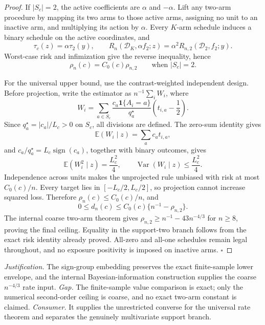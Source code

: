 \documentclass{article}
\begin{document}
\begin{proof}
If \(|S_c|=2\), the active coefficients are \(\alpha\) and \(-\alpha\). Lift any two-arm procedure by mapping its two arms to those active arms, assigning no unit to an inactive arm, and multiplying its action by \(\alpha\). Every \(K\)-arm schedule induces a binary schedule on the active coordinates, and
\[
 \tau_c(z)=\alpha\tau_2(y),
 \qquad
 R_n(\mathcal D_K,\alpha f_2;z)=\alpha^2R_{n,2}(\mathcal D_2,f_2;y).
\]
Worst-case risk and infimization give the reverse inequality, hence
\[
 \rho_n(c)=C_0(c)\rho_{n,2}
 \qquad\text{when }|S_c|=2.
\]

For the universal upper bound, use the contrast-weighted independent design. Before projection, write the estimator as \(n^{-1}\sum_iW_i\), where
\[
 W_i=\sum_{a\in S_c}\frac{c_a\mathbf1\{A_i=a\}}{q_a^\star}
 \left(t_{i,a}-\frac12\right).
\]
Since \(q_a^\star=|c_a|/L_c>0\) on \(S_c\), all divisions are defined. The zero-sum identity gives
\[
 \mathbb E(W_i\mid z)=\sum_ac_at_{i,a},
\]
and \(c_a/q_a^\star=L_c\operatorname{sign}(c_a)\), together with binary outcomes, gives
\[
 \mathbb E(W_i^2\mid z)=\frac{L_c^2}{4},
 \qquad
 \operatorname{Var}(W_i\mid z)\leq\frac{L_c^2}{4}.
\]
Independence across units makes the unprojected rule unbiased with risk at most \(C_0(c)/n\). Every target lies in \([-L_c/2,L_c/2]\), so projection cannot increase squared loss. Therefore \(\rho_n(c)\leq C_0(c)/n\), and
\[
 0\leq d_n(c)\leq C_0(c)\{n^{-1}-\rho_{n,2}\}.
\]
The internal coarse two-arm theorem gives \(\rho_{n,2}\geq n^{-1}-43n^{-4/3}\) for \(n\geq8\), proving the final ceiling. Equality in the support-two branch follows from the exact risk identity already proved. All-zero and all-one schedules remain legal throughout, and no exposure positivity is imposed on inactive arms. \(\square\)
\end{proof}
\par\smallskip\noindent \textit{Justification.} The sign-group embedding preserves the exact finite-sample lower envelope, and the internal Bayesian-information construction supplies the coarse \(n^{-4/3}\) rate input. \textit{Gap.} The finite-sample value comparison is exact; only the numerical second-order ceiling is coarse, and no exact two-arm constant is claimed. \textit{Consumer.} It supplies the unrestricted converse for the universal rate theorem and separates the genuinely multivariate support branch.
\end{document}
